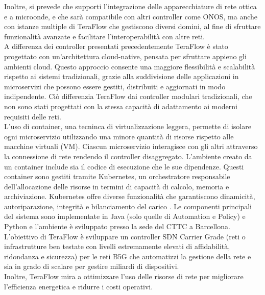 Inoltre, si prevede che supporti l'integrazione delle 
apparecchiature di rete ottica e a microonde, e che sarà compatibile con altri controller come ONOS, ma anche con istanze multiple di TeraFlow che gestiscono diversi domini, al fine di sfruttare funzionalità avanzate e facilitare l'interoperabilità con altre reti.
\\A differenza dei controller presentati precedentemente TeraFlow è stato progettato con un'architettura cloud-native, pensata per sfruttare appieno gli ambienti cloud.
Questo approccio consente una maggiore flessibilità e scalabilità rispetto ai sistemi tradizionali, grazie alla suddivisione delle applicazioni in microservizi che possono essere gestiti, distribuiti e aggiornati in modo indipendente.
Ciò differenzia TeraFlow dai controller modulari tradizionali, che non sono stati progettati con la stessa capacità di adattamento ai moderni requisiti delle reti.
\\L'uso di container, una tecninca di virtualizzazione leggera, permette di isolare ogni microservizio utilizzando una minore quantità di risorse rispetto alle macchine virtuali (VM).
Ciascun microservizio interagisce con gli altri attraverso la connessione di rete rendendo il controller disaggregato.
L'ambiente creato da un container include sia il codice di esecuzione che le sue dipendenze. %
Questi container sono gestiti tramite Kubernetes, un orchestratore responsabile dell'allocazione delle risorse in termini di capacità di calcolo, memoria e archiviazione\cite{arttfs}.
Kubernetes offre diverse funzionalità che garantiscono dinamicità, autoriparazione, integrità e bilanciamento del carico \cite{D53} \cite{D14}.
Le componenti principali del sistema sono implementate in Java (solo quelle di Automation e Policy) e Python e l'ambiente è sviluppato presso la sede del CTTC a Barcellona. 
L'obiettivo di TeraFlow è sviluppare un controller SDN Carrier Grade (reti o infrastrutture ben testate con livelli estremamente elevati di affidabilità, ridondanza e sicurezza) per le reti B5G che automatizzi la gestione della rete e sia in grado di scalare per gestire miliardi di dispositivi.
\\Inoltre, TeraFlow mira a ottimizzare l'uso delle risorse di rete per migliorare l'efficienza energetica e ridurre i costi operativi.
